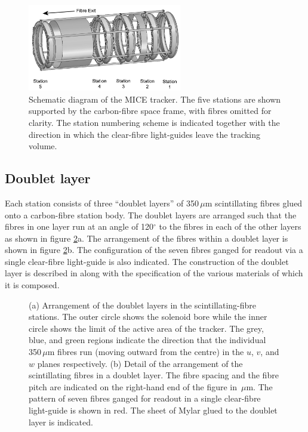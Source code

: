 \begin{figure}
  \includegraphics[width=0.6\textwidth]{detectors/tracker/02-Definitions/Figures/StnNum.pdf}
  \caption{Schematic diagram of the MICE tracker. The five stations are shown supported by the carbon-fibre space frame, with fibres omitted for clarity. The station numbering scheme is indicated together with the direction in which the clear-fibre light-guides leave the tracking volume.}
  \label{Fig:StnNum}
\end{figure}

\subsection{Doublet layer}
\label{SubSect:DblLyr}

Each station consists of three ``doublet layers'' of 350\,$\mu$m scintillating fibres glued onto a carbon-fibre station body.   The doublet layers are arranged such that the fibres in one layer run at an angle of 120$^\circ$ to the fibres in each of the other layers as shown in figure \ref{Fig:DblLyr}a.   The arrangement of the fibres within a doublet layer is shown in figure \ref{Fig:DblLyr}b.   The configuration of the seven fibres ganged for readout via a single clear-fibre light-guide is also indicated. The construction of the doublet layer is described in \cite{TrackerPaper} along with the specification of the various materials of which it is composed.
\begin{figure}
  \caption{(a) Arrangement of the doublet layers in the scintillating-fibre  stations. The outer circle shows the solenoid bore while the inner circle shows the limit of the active area of the tracker. The grey, blue, and green regions indicate the direction that the individual 350\,$\mu$m fibres run (moving outward from the centre) in the $u$, $v$, and $w$ planes respectively. (b) Detail of the arrangement of the scintillating fibres in a doublet layer. The fibre spacing and the fibre pitch are indicated on the right-hand end of the figure in \,$\mu$m. The pattern of seven fibres ganged for readout in a single clear-fibre light-guide is shown in red. The sheet of Mylar glued to the doublet layer is indicated.}
  \label{Fig:DblLyr}
\end{figure}

